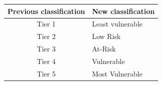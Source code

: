 \begin{table}[!h]


\centering
\begin{tabular}[t]{cl}
\toprule
Previous classification & New classification \\
\midrule
Tier 1 & Least vulnerable \\
\addlinespace
Tier 2 & Low Risk \\
\addlinespace
Tier 3 & At-Risk \\
\addlinespace
Tier 4 & Vulnerable \\
\addlinespace
Tier 5 & Most Vulnerable \\
\bottomrule
\end{tabular}
\end{table}